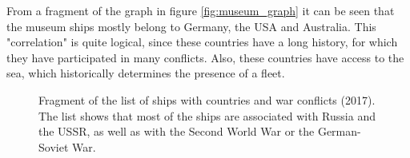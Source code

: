 From a fragment of the graph in figure \ref{fig:museum_graph} it can be seen that the museum ships mostly belong to Germany, the USA and Australia. This "correlation" is quite logical, since these countries have a long history, for which they have participated in many conflicts. Also, these countries have access to the sea, which historically determines the presence of a fleet.

\begin{figure*}[ht]
  {
  \setlength{\fboxsep}{0pt}%
  \setlength{\fboxrule}{1pt}%
  }
    \caption[List of ships with countries and war conflicts]{Fragment of the list of ships with countries and war conflicts (2017). The list shows that most of the ships are associated with Russia and the USSR, as well as with the Second World War or the German-Soviet War.}%
    \label{fig:ships_by_country_and_conflict}%
\end{figure*}